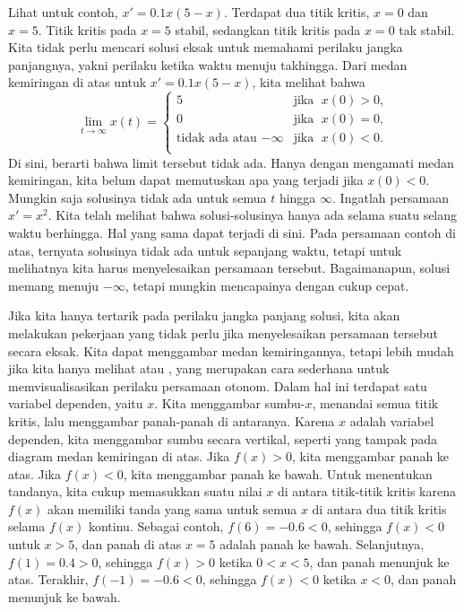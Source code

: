Lihat  untuk contoh, $x' = 0.1 x(5-x)$.
Terdapat dua titik kritis, $x=0$ dan $x=5$. Titik kritis
pada $x=5$ stabil, sedangkan titik kritis pada $x=0$
tak stabil.
Kita tidak perlu mencari solusi eksak untuk memahami
perilaku jangka panjangnya, yakni perilaku ketika waktu menuju takhingga.
Dari medan kemiringan di atas untuk
$x' = 0.1 x(5-x)$, kita melihat bahwa
\begin{equation*}
\lim_{t\to \infty} x(t) =
\begin{cases}
5 & \text{jika } \; x(0) > 0 , \\
0 & \text{jika } \; x(0) = 0 , \\
\text{tidak ada atau } {-\infty} & \text{jika } \; x(0) < 0 . \\
\end{cases}
\end{equation*}
Di sini,  berarti bahwa limit tersebut tidak ada.  Hanya dengan mengamati medan
kemiringan, kita
belum dapat memutuskan apa yang terjadi jika $x(0) < 0$.  Mungkin saja
solusinya tidak ada untuk semua $t$ hingga $\infty$.
Ingatlah persamaan $x' = x^2$.
Kita telah melihat bahwa solusi-solusinya hanya ada selama suatu selang waktu berhingga.
Hal yang sama dapat terjadi
di sini.  Pada persamaan contoh di atas, ternyata
solusinya tidak ada untuk sepanjang waktu, tetapi untuk melihatnya kita harus menyelesaikan
persamaan tersebut.  Bagaimanapun, solusi memang menuju $-\infty$, tetapi mungkin mencapainya
dengan cukup cepat.


Jika kita hanya tertarik pada perilaku jangka panjang solusi,
kita akan melakukan pekerjaan yang tidak perlu jika menyelesaikan
persamaan tersebut secara eksak.
Kita dapat menggambar medan kemiringannya, tetapi
lebih mudah jika kita hanya melihat \emph{} atau
\emph{}, yang merupakan cara sederhana
untuk memvisualisasikan perilaku
persamaan otonom.  Dalam hal ini terdapat satu variabel dependen, yaitu $x$.
Kita menggambar sumbu-$x$, menandai semua titik kritis,
lalu menggambar panah-panah di
antaranya.  Karena $x$ adalah variabel dependen, kita menggambar sumbu secara vertikal,
seperti yang tampak pada diagram medan kemiringan di atas.
Jika $f(x) > 0$, kita menggambar panah ke atas.  Jika $f(x) < 0$, kita menggambar
panah ke bawah.
Untuk menentukan tandanya, kita cukup memasukkan suatu nilai $x$ di antara titik-titik
kritis karena $f(x)$ akan memiliki tanda yang sama untuk semua $x$ di antara dua titik kritis
selama $f(x)$ kontinu.
Sebagai contoh, $f(6) = -0.6 < 0$, sehingga $f(x) < 0$ untuk $x > 5$,
dan panah di atas $x=5$ adalah panah
ke bawah.  Selanjutnya, $f(1) = 0.4 > 0$, sehingga $f(x) > 0$ ketika $0 < x < 5$, dan
panah menunjuk ke atas.  Terakhir, $f(-1) = -0.6 < 0$, sehingga $f(x) < 0$ ketika $x <
0$, dan panah menunjuk ke bawah.

